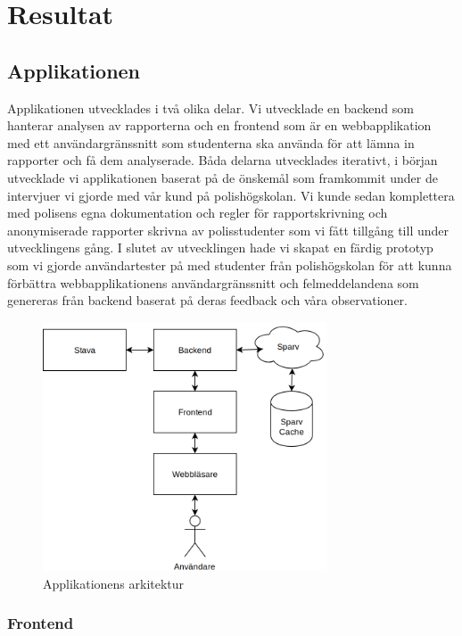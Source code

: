 \documentclass[swedish]{maucsthesis}
\begin{document}
\section{Resultat}
\subsection{Applikationen}\label{applikationen}

Applikationen utvecklades i två olika delar. Vi utvecklade en backend som
hanterar analysen av rapporterna och en frontend som är en webbapplikation med
ett användargränssnitt som studenterna ska använda för att lämna in rapporter
och få dem analyserade. Båda delarna utvecklades iterativt, i början utvecklade
vi applikationen baserat på de önskemål som framkommit under de intervjuer vi
gjorde med vår kund på polishögskolan. Vi kunde sedan komplettera med polisens
egna dokumentation och regler för rapportskrivning och anonymiserade rapporter
skrivna av polisstudenter som vi fått tillgång till under utvecklingens gång. I
slutet av utvecklingen hade vi skapat en färdig prototyp som vi gjorde
användartester på med studenter från polishögskolan för att kunna förbättra
webbapplikationens användargränssnitt och felmeddelandena som genereras från
backend baserat på deras feedback och våra observationer.

\begin{figure}[H]
    \centering
    \includegraphics[width=0.75\textwidth]{architecture.png}
    \caption{Applikationens arkitektur}
    \label{fig:architecture}
\end{figure}

\subsubsection{Frontend}
\end{document}
